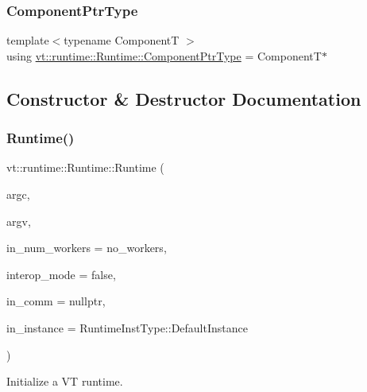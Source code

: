\subsubsection{\texorpdfstring{Component\+Ptr\+Type}{ComponentPtrType}}
{\footnotesize\ttfamily template$<$typename ComponentT $>$ \\
using \hyperlink{structvt_1_1runtime_1_1_runtime_a0893bf0a8c03b898e8ab66b52cec80ad}{vt\+::runtime\+::\+Runtime\+::\+Component\+Ptr\+Type} =  ComponentT$\ast$}



\subsection{Constructor \& Destructor Documentation}
\mbox{\label{structvt_1_1runtime_1_1_runtime_a887f6037ec367f708ee84b4dcc1397b4}} 
\subsubsection{\texorpdfstring{Runtime()}{Runtime()}\hspace{0.1cm}{\footnotesize\ttfamily [1/3]}}
{\footnotesize\ttfamily vt\+::runtime\+::\+Runtime\+::\+Runtime (\begin{DoxyParamCaption}\item[{int \&}]{argc,  }\item[{char $\ast$$\ast$\&}]{argv,  }\item[{\hyperlink{namespacevt_aa93398ea48f2cb6c188512250f7cc248}{Worker\+Count\+Type}}]{in\+\_\+num\+\_\+workers = {\ttfamily no\+\_\+workers},  }\item[{bool const}]{interop\+\_\+mode = {\ttfamily false},  }\item[{M\+P\+I\+\_\+\+Comm $\ast$}]{in\+\_\+comm = {\ttfamily nullptr},  }\item[{\hyperlink{namespacevt_1_1runtime_afca910c1b38b3975f7c1da8001a77d58}{Runtime\+Inst\+Type} const}]{in\+\_\+instance = {\ttfamily RuntimeInstType\+:\+:DefaultInstance} }\end{DoxyParamCaption})}



Initialize a VT runtime. 


